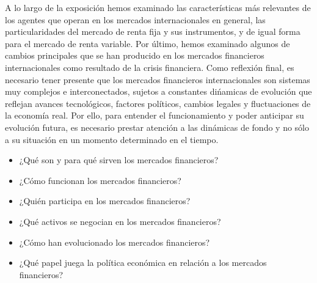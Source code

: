 \documentclass{nuevotema}
\begin{document}
A lo largo de la exposición hemos examinado las características más relevantes de los agentes que operan en los mercados internacionales en general, las particularidades del mercado de renta fija y sus instrumentos, y de igual forma para el mercado de renta variable. Por último, hemos examinado algunos de cambios principales que se han producido en los mercados financieros internacionales como resultado de la crisis financiera. Como reflexión final, es necesario tener presente que los mercados financieros internacionales son sistemas muy complejos e interconectados, sujetos a constantes dińamicas de evolución que reflejan avances tecnológicos, factores políticos, cambios legales y fluctuaciones de la economía real. Por ello, para entender el funcionamiento y poder anticipar su evolución futura, es necesario prestar atención a las dinámicas de fondo y no sólo a su situación en un momento determinado en el tiempo.


\begin{itemize}
    \item ¿Qué son y para qué sirven los mercados financieros?
    \item ¿Cómo funcionan los mercados financieros?
    \item ¿Quién participa en los mercados financieros?
    \item ¿Qué activos se negocian en los mercados financieros?
    \item ¿Cómo han evolucionado los mercados financieros?
    \item ¿Qué papel juega la política económica en relación a los mercados financieros?
\end{itemize}

\esquemacorto
\end{document}
